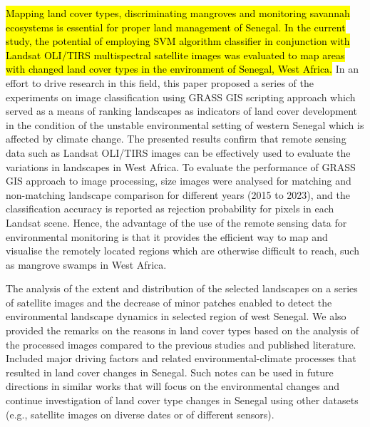 \documentclass[earth,article,submit,pdftex,moreauthors]{Definitions/mdpi}
\begin{document}
\hl{Mapping land cover types, discriminating mangroves and monitoring savannah ecosystems is essential for proper land management of Senegal. In the current study, the potential of employing SVM algorithm classifier in conjunction with Landsat OLI/TIRS multispectral satellite images was evaluated to map areas with changed land cover types in the environment of Senegal, West Africa. }In an effort to drive research in this field, this paper proposed a series of the experiments on image classification using GRASS GIS scripting approach which served as a means of ranking landscapes as indicators of land cover development in the condition of the unstable environmental setting of western Senegal which is affected by climate change. The presented results confirm that remote sensing data such as Landsat OLI/TIRS images can be effectively used to evaluate the variations in landscapes in West Africa. To evaluate the performance of GRASS GIS approach to image processing, size images were analysed for matching and non-matching landscape comparison for different years (2015 to 2023), and the classification accuracy is reported as rejection probability for pixels in each Landsat scene. Hence, the advantage of the use of the remote sensing data for environmental monitoring is that it provides the efficient way to map and visualise the remotely located regions which are otherwise difficult to reach, such as mangrove swamps in West Africa. 

The analysis of the extent and distribution of the selected landscapes on a series of satellite images and the decrease of minor patches enabled to detect the environmental landscape dynamics in selected region of west Senegal. We also provided the remarks on the reasons in land cover types based on the analysis of the processed images compared to the previous studies and published literature. Included major driving factors and related environmental-climate processes that resulted in land cover changes in Senegal. Such notes can be used in future directions in similar works that will focus on the environmental changes and continue investigation of land cover type changes in Senegal using other datasets (e.g., satellite images on diverse dates or of different sensors).
\end{document}
